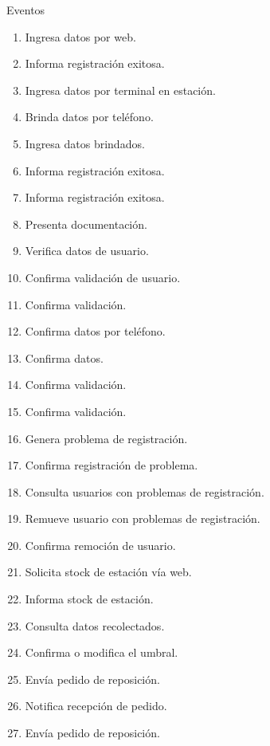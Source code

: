 \begin{subsection}{Eventos}


	
	\begin{enumerate}
	\item Ingresa datos por web.
	\item Informa registración exitosa.
	\item Ingresa datos por terminal en estación.
	\item Brinda datos por teléfono.
	\item Ingresa datos brindados.
	\item Informa registración exitosa.
	\item Informa registración exitosa.
	\item Presenta documentación.
	\item Verifica datos de usuario.
	\item Confirma validación de usuario.
	\item Confirma validación.
	\item Confirma datos por teléfono.
	\item Confirma datos.
	\item Confirma validación.
	\item Confirma validación.
	\item Genera problema de registración.
	\item Confirma registración de problema.
	\item Consulta usuarios con problemas de registración.
	\item Remueve usuario con problemas de registración.
	\item Confirma remoción de usuario.
	\item Solicita stock de estación vía web.
	\item Informa stock de estación.
	\item Consulta datos recolectados.
	\item Confirma o modifica el umbral.
	\item Envía pedido de reposición.
	\item Notifica recepción de pedido.
	\item Envía pedido de reposición.

\end{enumerate}
\end{subsection}
